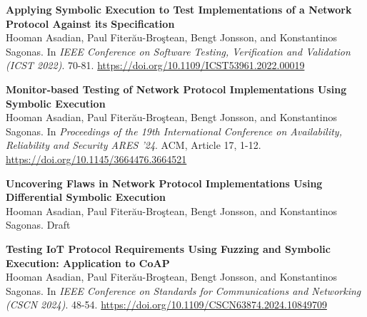 \documentclass{stylefiles/UUThesisTemplate}
\begin{document}
\frontmatter
    \frontmatterCS 
 
   \dedication{Dedicated to my parents Hanieh \& Mohammad}
 
    \begin{listofpapers}
    	\item \textbf{Applying Symbolic Execution to Test Implementations of a Network Protocol Against its Specification} \label{ICST@2022} \\
    	Hooman Asadian, Paul Fiter\u{a}u-Bro\c{s}tean, Bengt Jonsson, and Konstantinos Sagonas. In \emph{IEEE Conference on Software Testing, Verification and Validation (ICST 2022)}. 70-81. \url{https://doi.org/10.1109/ICST53961.2022.00019}
    	
    	\item \textbf{Monitor-based Testing of Network Protocol Implementations Using Symbolic Execution}\label{ARES@2024} \\
    	Hooman Asadian, Paul Fiter\u{a}u-Bro\c{s}tean, Bengt Jonsson, and Konstantinos Sagonas. In \emph{Proceedings of the 19th International Conference on Availability, Reliability and Security ARES '24}. ACM, Article 17, 1-12.
    	\url{https://doi.org/10.1145/3664476.3664521}
    	
    	\item \textbf{Uncovering Flaws in Network Protocol Implementations Using Differential Symbolic Execution}\label{symdiff@under} \\
    	Hooman Asadian, Paul Fiter\u{a}u-Bro\c{s}tean, Bengt Jonsson, and Konstantinos Sagonas.
    	Draft
    	\url{}
    	
    	\item \textbf{Testing IoT Protocol Requirements Using Fuzzing and Symbolic Execution: Application to CoAP}\label{cscn@2024} \\
    	Hooman Asadian, Paul Fiter\u{a}u-Bro\c{s}tean, Bengt Jonsson, and Konstantinos Sagonas. In \emph{IEEE Conference on Standards for Communications and Networking (CSCN 2024)}. 48-54.
    	\url{https://doi.org/10.1109/CSCN63874.2024.10849709} 
    	
    \end{listofpapers}
    
\end{document}
